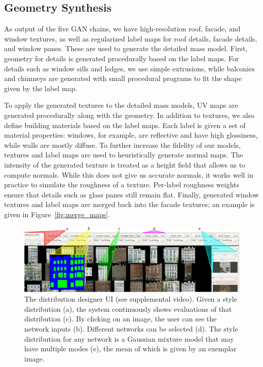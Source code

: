 \subsection{Geometry Synthesis}
\label{sec:geometry_synthesis}

As output of the five GAN chains, we have high-resolution roof, facade, and window textures, as well as regularized label maps for roof details, facade details, and window panes. These are used to generate the detailed mass model. First, geometry for details is generated procedurally based on the label maps. For details such as window sills and ledges, we use simple extrusions, while balconies and chimneys are generated with small procedural programs to fit the shape given by the label map. 

To apply the generated textures to the detailed mass models, UV maps are generated procedurally along with the geometry. In addition to textures, we also define building materials based on the label maps. Each label is given a set of material properties: windows, for example, are reflective and have high glossiness, while walls are mostly diffuse. To further increase the fidelity of our models, textures and label maps are used to heuristically generate normal maps. The intensity of the generated texture is treated as a height field that allows us to compute normals. While this does not give us accurate normals, it works well in practice to simulate the roughness of a texture. Per-label roughness weights ensure that details such as glass panes still remain flat. Finally, generated window textures and label maps are merged back into the facade textures; an example is given in Figure~\ref{fig:merge_maps}.

\begin{figure}[t]
    \centering
    \includegraphics[width=\textwidth]{images/ui_fig.pdf}
    \caption{The distribution designer UI (see supplemental video). Given a style distribution (a), the system continuously shows evaluations of that distribution (c). By clicking on an image, the user can see the network inputs (b). Different networks can be selected (d). The style distribution for any network is a Gaussian mixture model that may have multiple modes (e), the mean of which is given by an exemplar image.}
    \vspace{-5pt}
    \label{fig:ui}
\end{figure}

